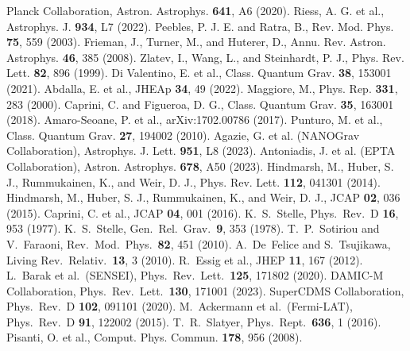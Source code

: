 \documentclass[preprint,aps,prd,onecolumn,nofootinbib,longbibliography]{revtex4-2}
\numberwithin{equation}{section}
\begin{document}
{\raggedright
\begin{thebibliography}{99}

 Planck Collaboration, Astron. Astrophys. \textbf{641}, A6 (2020).
 Riess, A. G. et al., Astrophys. J. \textbf{934}, L7 (2022).
 Peebles, P. J. E. and Ratra, B., Rev. Mod. Phys. \textbf{75}, 559 (2003).
 Frieman, J., Turner, M., and Huterer, D., Annu. Rev. Astron. Astrophys. \textbf{46}, 385 (2008).
 Zlatev, I., Wang, L., and Steinhardt, P. J., Phys. Rev. Lett. \textbf{82}, 896 (1999).
 Di Valentino, E. et al., Class. Quantum Grav. \textbf{38}, 153001 (2021).
 Abdalla, E. et al., JHEAp \textbf{34}, 49 (2022).
 Maggiore, M., Phys. Rep. \textbf{331}, 283 (2000).
 Caprini, C. and Figueroa, D. G., Class. Quantum Grav. \textbf{35}, 163001 (2018).
 Amaro-Seoane, P. et al., arXiv:1702.00786 (2017).
 Punturo, M. et al., Class. Quantum Grav. \textbf{27}, 194002 (2010).
 Agazie, G. et al. (NANOGrav Collaboration), Astrophys. J. Lett. \textbf{951}, L8 (2023).
 Antoniadis, J. et al. (EPTA Collaboration), Astron. Astrophys. \textbf{678}, A50 (2023).
 Hindmarsh, M., Huber, S. J., Rummukainen, K., and Weir, D. J., Phys. Rev. Lett. \textbf{112}, 041301 (2014).
 Hindmarsh, M., Huber, S. J., Rummukainen, K., and Weir, D. J., JCAP \textbf{02}, 036 (2015).
 Caprini, C. et al., JCAP \textbf{04}, 001 (2016).
 K.~S.~Stelle, Phys.\ Rev.\ D \textbf{16}, 953 (1977).
 K.~S.~Stelle, Gen.\ Rel.\ Grav.\ \textbf{9}, 353 (1978).
 T.~P.~Sotiriou and V.~Faraoni, Rev.\ Mod.\ Phys.\ \textbf{82}, 451 (2010).
 A.~De~Felice and S.~Tsujikawa, Living Rev.\ Relativ.\ \textbf{13}, 3 (2010).
 R.~Essig et al., JHEP \textbf{11}, 167 (2012).
 L.~Barak et al.\ (SENSEI), Phys.\ Rev.\ Lett.\ \textbf{125}, 171802 (2020).
 DAMIC-M Collaboration, Phys.\ Rev.\ Lett.\ \textbf{130}, 171001 (2023).
 SuperCDMS Collaboration, Phys.\ Rev.\ D \textbf{102}, 091101 (2020).
 M.~Ackermann et al.\ (Fermi-LAT), Phys.\ Rev.\ D \textbf{91}, 122002 (2015).
 T.~R.~Slatyer, Phys.\ Rept.\ \textbf{636}, 1 (2016).
 Pisanti, O. et al., Comput. Phys. Commun. \textbf{178}, 956 (2008).

\end{thebibliography}}
\end{document}
